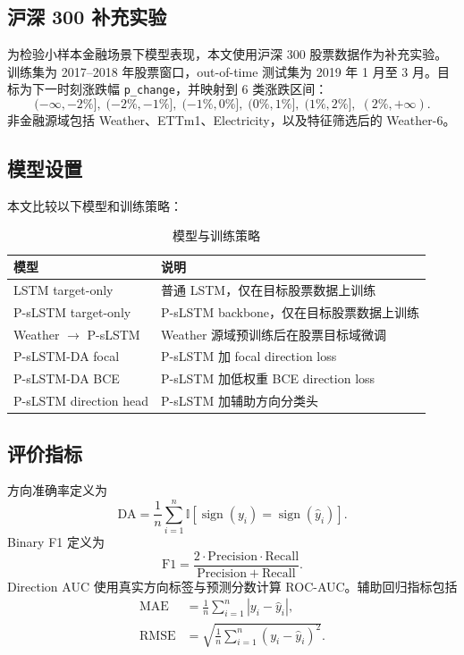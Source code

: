 \documentclass[UTF8,a4paper,twocolumn]{ctexart}
\begin{document}
\subsection{沪深 300 补充实验}

为检验小样本金融场景下模型表现，本文使用沪深 300 股票数据作为补充实验。训练集为 2017--2018 年股票窗口，out-of-time 测试集为 2019 年 1 月至 3 月。目标为下一时刻涨跌幅 \texttt{p\_change}，并映射到 6 类涨跌区间：
\begin{equation}
  (-\infty,-2\%],\;(-2\%,-1\%],\;(-1\%,0\%],\;(0\%,1\%],\;(1\%,2\%],\;(2\%,+\infty).
\end{equation}
非金融源域包括 Weather、ETTm1、Electricity，以及特征筛选后的 Weather-6。

\subsection{模型设置}

本文比较以下模型和训练策略：

\begin{table}[H]
\centering
\caption{模型与训练策略}
\label{tab:model_setting}
\begin{tabular}{p{}p{}}
\toprule
模型 & 说明 \\
\midrule
LSTM target-only & 普通 LSTM，仅在目标股票数据上训练 \\
P-sLSTM target-only & P-sLSTM backbone，仅在目标股票数据上训练 \\
Weather $\rightarrow$ P-sLSTM & Weather 源域预训练后在股票目标域微调 \\
P-sLSTM-DA focal & P-sLSTM 加 focal direction loss \\
P-sLSTM-DA BCE & P-sLSTM 加低权重 BCE direction loss \\
P-sLSTM direction head & P-sLSTM 加辅助方向分类头 \\
\bottomrule
\end{tabular}
\end{table}

\subsection{评价指标}

方向准确率定义为
\begin{equation}
  \mathrm{DA}=\frac{1}{n}\sum_{i=1}^{n}\mathbb{I}\left[\operatorname{sign}(y_i)=\operatorname{sign}(\hat y_i)\right].
\end{equation}
Binary F1 定义为
\begin{equation}
  \mathrm{F1}=\frac{2\cdot \mathrm{Precision}\cdot \mathrm{Recall}}{\mathrm{Precision}+\mathrm{Recall}}.
\end{equation}
Direction AUC 使用真实方向标签与预测分数计算 ROC-AUC。辅助回归指标包括
\begin{align}
  \mathrm{MAE}&=\frac{1}{n}\sum_{i=1}^{n}|y_i-\hat y_i|,\\
  \mathrm{RMSE}&=\sqrt{\frac{1}{n}\sum_{i=1}^{n}(y_i-\hat y_i)^2}.
\end{align}
\end{document}
